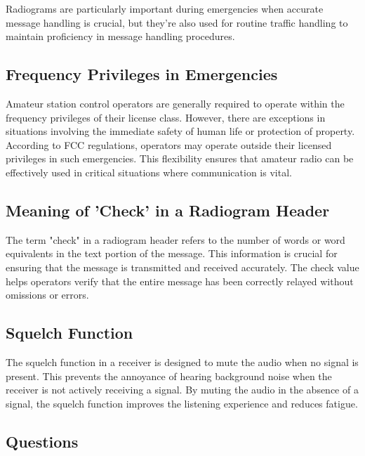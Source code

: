 Radiograms are particularly important during emergencies when accurate message handling is crucial, but they're also used for routine traffic handling to maintain proficiency in message handling procedures.




\subsection*{Frequency Privileges in Emergencies}

Amateur station control operators are generally required to operate within the frequency privileges of their license class. However, there are exceptions in situations involving the immediate safety of human life or protection of property. According to FCC regulations, operators may operate outside their licensed privileges in such emergencies. This flexibility ensures that amateur radio can be effectively used in critical situations where communication is vital.

\subsection*{Meaning of 'Check' in a Radiogram Header}

The term "check" in a radiogram header refers to the number of words or word equivalents in the text portion of the message. This information is crucial for ensuring that the message is transmitted and received accurately. The check value helps operators verify that the entire message has been correctly relayed without omissions or errors.

\subsection*{Squelch Function}

The squelch function in a receiver is designed to mute the audio when no signal is present. This prevents the annoyance of hearing background noise when the receiver is not actively receiving a signal. By muting the audio in the absence of a signal, the squelch function improves the listening experience and reduces fatigue.

\subsection*{Questions}

